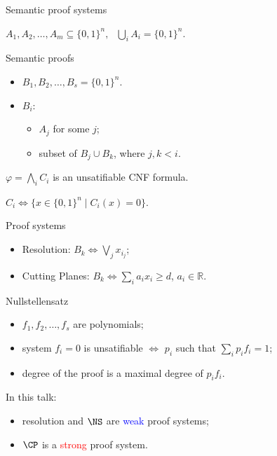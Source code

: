 \begin{frame}{Semantic proof systems}

    \pause
    $A_1, A_2, \dots, A_m \subseteq \{0, 1\}^n, ~~~ \bigcup\limits_{i} A_i = \{0, 1\}^n$.

    \pause

    \begin{block}{Semantic proofs}
        \begin{itemize}
            \item $B_1, B_2, \dots, B_s = \{0, 1\}^n$.
            \item $B_i$:
                \begin{itemize}
                    \item $A_j$ for some $j$;
                    \item subset of $B_j \cup B_k$, where $j, k < i$.
                \end{itemize}
                
        \end{itemize}
    \end{block}

    \pause

    
    $\varphi = \bigwedge\limits_{i} C_i$ is an unsatifiable CNF formula.

    $C_i \Leftrightarrow \{x \in \{0, 1\}^n \mid C_i(x) = 0\}$.

    \pause

    \begin{block}{Proof systems}
        \begin{itemize}
            \item Resolution: $B_k \Leftrightarrow \bigvee\limits_{j} x_{i_j}$;
            \item Cutting Planes: $B_k \Leftrightarrow \sum\limits_{i} a_i x_{i} \ge d$, $a_i \in \mathbb{R}$.
        \end{itemize}
    \end{block}
\end{frame}

\begin{frame}{Nullstellensatz}

    \pause

    \begin{itemize}
        \item $f_1, f_2, \dots, f_s$ are polynomials;
        \pause    
        \item system $f_i = 0$ is unsatifiable $\Leftrightarrow$ \be $p_i$ such that $\sum\limits_{i} p_i
            f_i = 1$;
        \pause
        \item degree of the proof is a maximal degree of $p_i f_i$.
    \end{itemize}


    \pause

    \vspace{1cm}

    In this talk:
    \begin{itemize}
        \item resolution and $\NS$ are \textcolor{blue}{weak} proof systems;
        \item $\CP$ is a \textcolor{red}{strong} proof system.
    \end{itemize}
\end{frame}